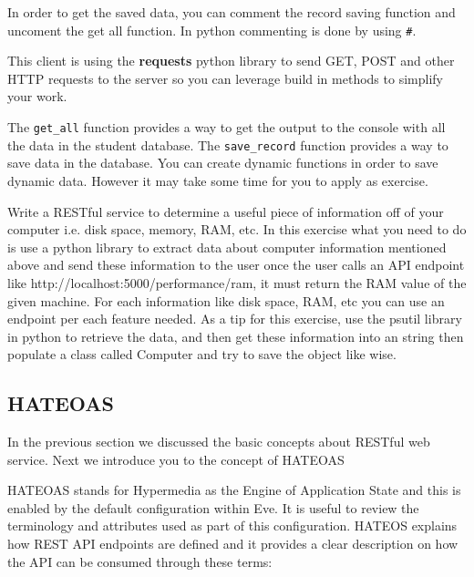 In order to get the saved data, you can comment the record saving function and
uncoment the get all function. In python commenting is done by using \verb|#|.

This client is using the \textbf{requests} python
library to send GET, POST and other HTTP requests to the server so you
can leverage build in methods to simplify your work.

The \verb|get_all| function provides a way to get the output to the
console with all the data in the student database. The \verb|save_record|
function provides a way to save data in the database. You can create
dynamic functions in order to save dynamic data. However it may take
some time for you to apply as exercise.

\begin{exercise}
Write a RESTful service to determine a useful piece of information off
of your computer i.e. disk space, memory, RAM, etc. In this exercise what
you need to do is use a python library to extract data about computer
information mentioned above and send these information to the user once
the user calls an API endpoint like http://localhost:5000/performance/ram,
it must return the RAM value of the given machine. For each information like
disk space, RAM, etc you can use an endpoint per each feature needed. As a tip 
for this exercise, use the psutil library in python to retrieve the data, and
then get these information into an string then populate a class called Computer 
and try to save the object like wise.
\end{exercise}

\subsection{HATEOAS}\label{s:hateoas}

In the previous section we discussed the basic concepts about RESTful
web service. Next we introduce you to the concept of HATEOAS

HATEOAS stands for Hypermedia as the Engine of Application State and
this is enabled by the default configuration within Eve. It is useful
to review the terminology and attributes used as part of this
configuration. HATEOS explains how REST API endpoints are defined and it
provides a clear description on how the API can be consumed through
these terms:

